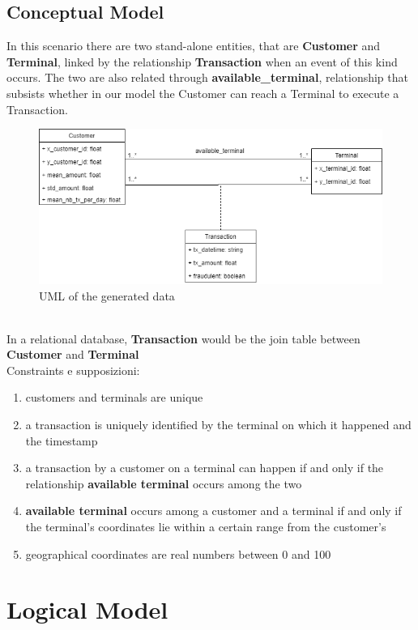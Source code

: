 \documentclass[runningheads]{llncs}
\begin{document}
\subsection{Conceptual Model}
In this scenario there are two stand-alone entities, that are \textbf{Customer} and \textbf{Terminal}, linked by the relationship \textbf{Transaction} when an event of this kind occurs. The two are also related through \textbf{available\_terminal}, relationship that subsists whether in our model the Customer can reach a Terminal to execute a Transaction.
\begin{figure}[!htb] 
        \centering \includegraphics[width=0.9\columnwidth]{images/FraudDetectionUML.png}
        \caption{\label{fig1}UML of the generated data}
\end{figure}
\\
In a relational database, \textbf{Transaction} would be the join table between \textbf{Customer} and  \textbf{Terminal}
\\
Constraints e supposizioni:
\begin{enumerate}
    \item customers and terminals are unique
    \item a transaction is uniquely identified by the terminal on which it happened and the timestamp
    \item a transaction by a customer on a terminal can happen if and only if the relationship \textbf{available terminal} occurs among the two
    \item \textbf{available terminal} occurs among a customer and a terminal if and only if the terminal's coordinates lie within a certain range from the customer's
    \item geographical coordinates are real numbers between 0 and 100
\end{enumerate}

\section{Logical Model}
\end{document}
